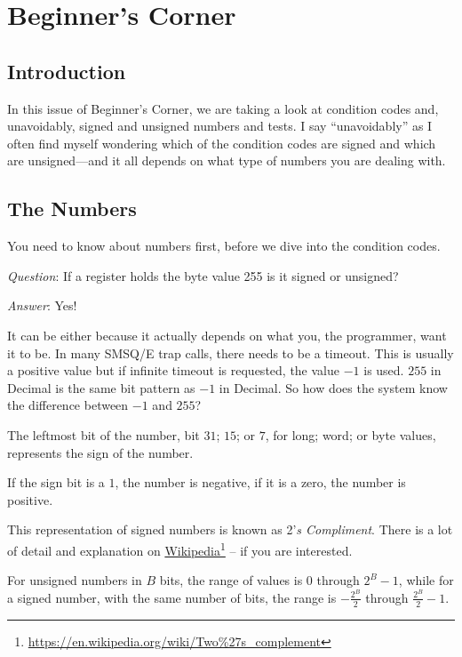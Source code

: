 
\chapter{Beginner's Corner}\label{chpater: beginners corner}

\section{Introduction}

In this issue of Beginner's Corner, we are taking a look at condition
codes and, unavoidably, signed and unsigned numbers and tests. I say
``unavoidably'' as I often find myself wondering which of the condition
codes are signed and which are unsigned---and it all depends on
what type of numbers you are dealing with.

\section{The Numbers}

You need to know about numbers first, before we dive into the condition
codes. 

\emph{Question}: If a register holds the byte value 255
is it signed or unsigned?

\emph{Answer}: Yes!

It can be either because it actually depends on what you, the programmer,
want it to be. In many SMSQ/E trap calls, there needs to be a timeout.
This is usually a positive value but if infinite timeout is requested,
the value $-1$ is used. $255$ in Decimal is the same bit pattern
as $-1$ in Decimal. So how does the system know the difference between
$-1$ and $255$?

The leftmost bit of the number, bit $31$; $15$; or $7$, for long;
word; or byte values, represents the sign of the number. 

If the sign bit is a $1$, the number is negative, if it is a zero,
the number is positive. 

This representation of signed numbers is known as 2'\emph{s Compliment}.
There is a lot of detail and explanation on \href{https://en.wikipedia.org/wiki/Two\%27s_complement}{Wikipedia}\footnote{\url{https://en.wikipedia.org/wiki/Two\%27s\_complement}}
-- if you are interested. 

For unsigned numbers in $B$ bits, the range of values is $0$ through
$2^{B}-1$, while for a signed number, with the same number of bits,
the range is $-\frac{2^{B}}{2}$ through $\frac{2^{B}}{2}-1$.

